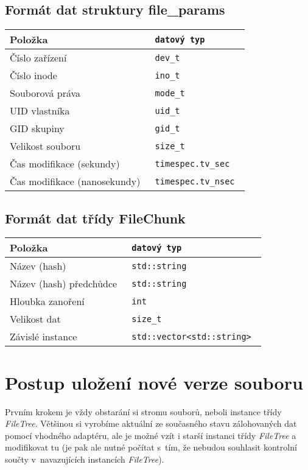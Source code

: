 \subsection{Formát dat struktury file\_params}

\begin{tabular}{l >{\tt}l}
\bf Položka & \bf datový typ \\
\hline
Číslo zařízení & dev\_t \\
Číslo inode & ino\_t \\
Souborová práva & mode\_t \\
UID vlastníka & uid\_t \\
GID skupiny & gid\_t \\
Velikost souboru & size\_t \\
Čas modifikace (sekundy) & timespec.tv\_sec \\
Čas modifikace (nanosekundy) & timespec.tv\_nsec \\
\end{tabular}

\subsection{Formát dat třídy FileChunk}

\begin{tabular}{l >{\tt}l}
\bf Položka & \bf datový typ \\
\hline
Název (hash) & std::string \\
Název (hash) předchůdce & std::string \\
Hloubka zanoření & int \\
Velikost dat & size\_t \\
Závislé instance & std::vector<std::string> \\
\end{tabular}

\section{Postup uložení nové verze souboru}

Prvním krokem je vždy obstarání si stromu souborů, neboli instance třídy
{\it FileTree}. Většinou si vyrobíme aktuální ze současného stavu zálohovaných
dat pomocí vhodného adaptéru, ale je možné vzít i starší instanci třídy
{\it FileTree} a modifikovat tu (je pak ale nutné počítat s~tím, že nebudou
souhlasit kontrolní součty v~navazujících instancích {\it FileTree}).

\newpage


